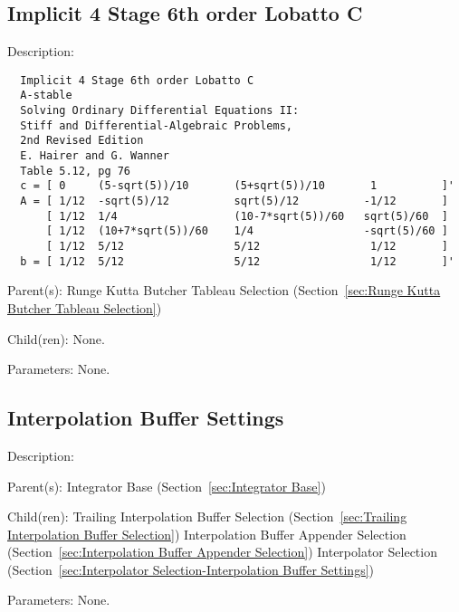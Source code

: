 \subsection{Implicit 4 Stage 6th order Lobatto C}
\label{sec:Implicit 4 Stage 6th order Lobatto C}

\begin{list}{}
  {\setlength{\leftmargin}{1.0in}
   \setlength{\labelwidth}{0.75in}
   \setlength{\labelsep}{0.125in}}
  \item[Description:]
\begin{verbatim}
  Implicit 4 Stage 6th order Lobatto C
  A-stable
  Solving Ordinary Differential Equations II:
  Stiff and Differential-Algebraic Problems,
  2nd Revised Edition
  E. Hairer and G. Wanner
  Table 5.12, pg 76
  c = [ 0     (5-sqrt(5))/10       (5+sqrt(5))/10       1          ]'
  A = [ 1/12  -sqrt(5)/12          sqrt(5)/12          -1/12       ]
      [ 1/12  1/4                  (10-7*sqrt(5))/60   sqrt(5)/60  ]
      [ 1/12  (10+7*sqrt(5))/60    1/4                 -sqrt(5)/60 ]
      [ 1/12  5/12                 5/12                 1/12       ]
  b = [ 1/12  5/12                 5/12                 1/12       ]'
\end{verbatim}
  \item[Parent(s):]
    Runge Kutta Butcher Tableau Selection (Section~\ref{sec:Runge Kutta Butcher Tableau Selection})
  \item[Child(ren):]
    None. 
  \item[Parameters:]
    None. 
\end{list}

\subsection{Interpolation Buffer Settings}
\label{sec:Interpolation Buffer Settings}

\begin{list}{}
  {\setlength{\leftmargin}{1.0in}
   \setlength{\labelwidth}{0.75in}
   \setlength{\labelsep}{0.125in}}
  \item[Description:]
  \item[Parent(s):]
    Integrator Base (Section~\ref{sec:Integrator Base})
  \item[Child(ren):]
    Trailing Interpolation Buffer Selection (Section~\ref{sec:Trailing Interpolation Buffer Selection})
      \newline 
    Interpolation Buffer Appender Selection (Section~\ref{sec:Interpolation Buffer Appender Selection})
      \newline 
    Interpolator Selection (Section~\ref{sec:Interpolator Selection-Interpolation Buffer Settings})
  \item[Parameters:]
    None. 
\end{list}

